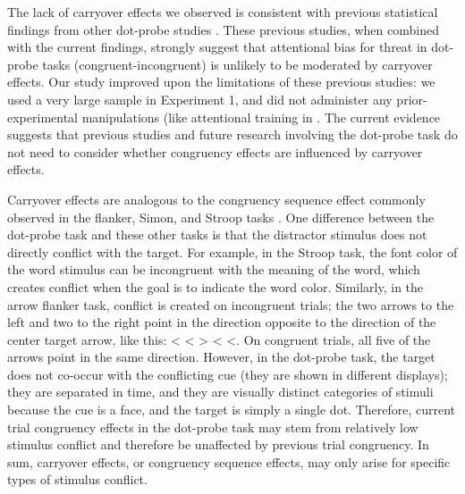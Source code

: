 \documentclass[issue,twocolumn,empirical, authordate,10pt]{jote-new-article}
\begin{document}
The lack of carryover effects we observed is consistent with previous statistical findings from other dot-probe studies \parencite{Gladwin2017, Hill2016, Hill2016}. These previous studies, when combined with the current findings, strongly suggest that attentional bias for threat in dot-probe tasks (congruent-incongruent) is unlikely to be moderated by carryover effects. Our study improved upon the limitations of these previous studies: we used a very large sample in Experiment 1, and did not administer any prior-experimental manipulations (like attentional training in \parencite{Hill2016}. The current evidence suggests that previous studies and future research involving the dot-probe task do not need to consider whether congruency effects are influenced by carryover effects.

Carryover effects are analogous to the congruency sequence effect commonly observed in the flanker, Simon, and Stroop tasks \parencite{Duthoo2014}. One difference between the dot-probe task and these other tasks is that the distractor stimulus does not directly conflict with the target. For example, in the Stroop task, the font color of the word stimulus can be incongruent with the meaning of the word, which creates conflict when the goal is to indicate the word color. Similarly, in the arrow flanker task, conflict is created on incongruent trials; the two arrows to the left and two to the right point in the direction opposite to the direction of the center target arrow, like this: < < > < <. On congruent trials, all five of the arrows point in the same direction. However, in the dot-probe task, the target does not co-occur with the conflicting cue (they are shown in different displays); they are separated in time, and they are visually distinct categories of stimuli because the cue is a face, and the target is simply a single dot. Therefore, current trial congruency effects in the dot-probe task may stem from relatively low stimulus conflict and therefore be unaffected by previous trial congruency. In sum, carryover effects, or congruency sequence effects, may only arise for specific types of stimulus conflict.
\end{document}
